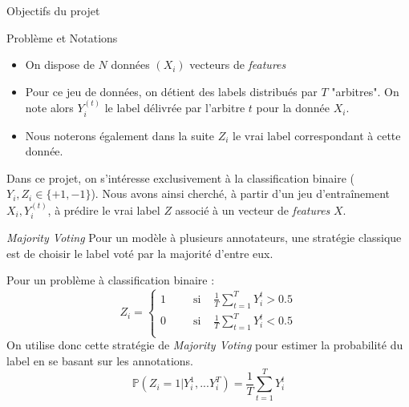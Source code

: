 \documentclass[final]{beamer}
\newlength{\onecolwid}
\begin{document}
\begin{frame}[t]
\begin{columns}[t]
\begin{column}{\onecolwid}
\begin{alertblock}{Objectifs du projet}
\end{alertblock}




  \vspace{1cm}
  \begin{block}{Problème et Notations}
  \begin{itemize}
      \item On dispose de $N$ données $(X_i)$ vecteurs de \textit{features}
      \item Pour ce jeu de données, on détient des labels distribués par $T$ "arbitres". On note alors $Y_i^{(t)}$ le label délivrée par l'arbitre $t$ pour la donnée $X_i$.
      \item Nous noterons également dans la suite $Z_i$ le vrai label correspondant à cette donnée.
  \end{itemize}

  Dans ce projet, on s'intéresse exclusivement à la classification binaire ($Y_i,Z_i \in \{+1,-1\}$).
  Nous avons ainsi cherché, à partir d'un jeu d'entraînement $X_i,Y_i^{(t)}$, à prédire le vrai label $Z$ associé à un vecteur de \textit{features} $X$.

  \end{block}


   \vspace{2cm}
 \begin{alertblock}{\textit{Majority Voting}}
    Pour un modèle à plusieurs annotateurs, une stratégie classique est de choisir le label voté par la majorité d'entre eux.
    \par
    Pour un problème à classification binaire :
    $$ Z_i = \left\{ \begin{array}{llcl}
1 & \;\;\; &\text{si } & \frac{1}{T} \displaystyle \sum_{t=1}^T Y_i^t > 0.5 \\
 0 &\;\;\; &\text{si} & \frac{1}{T} \displaystyle\sum_{t=1}^T Y_i^t < 0.5  \\
\end{array} \right. $$
On utilise donc cette stratégie de \textit{Majority Voting} pour estimer la probabilité du label en se basant sur les annotations.
$$ \mathbb{P}(Z_i = 1 | Y_i^1,...Y_i^T) = \frac{1}{T} \displaystyle \sum_{t=1}^T Y_i^t $$
 \end{alertblock}


\end{column}
\end{columns}
\end{frame}
\end{document}
